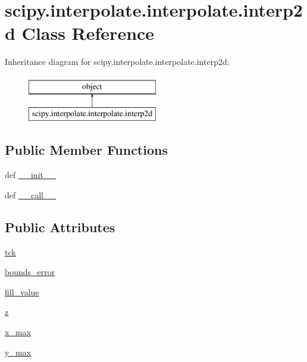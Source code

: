 \hypertarget{classscipy_1_1interpolate_1_1interpolate_1_1interp2d}{}\section{scipy.\+interpolate.\+interpolate.\+interp2d Class Reference}
\label{classscipy_1_1interpolate_1_1interpolate_1_1interp2d}
Inheritance diagram for scipy.\+interpolate.\+interpolate.\+interp2d\+:\begin{figure}[H]
\begin{center}
\leavevmode
\includegraphics[height=2.000000cm]{classscipy_1_1interpolate_1_1interpolate_1_1interp2d}
\end{center}
\end{figure}
\subsection*{Public Member Functions}
\begin{DoxyCompactItemize}
\item 
def \hyperlink{classscipy_1_1interpolate_1_1interpolate_1_1interp2d_a7bb7569e49bfe29d8b22ef46462da961}{\+\_\+\+\_\+init\+\_\+\+\_\+}
\item 
def \hyperlink{classscipy_1_1interpolate_1_1interpolate_1_1interp2d_a33af6dd1c405a6d5972435fbfd6e4d89}{\+\_\+\+\_\+call\+\_\+\+\_\+}
\end{DoxyCompactItemize}
\subsection*{Public Attributes}
\begin{DoxyCompactItemize}
\item 
\hyperlink{classscipy_1_1interpolate_1_1interpolate_1_1interp2d_a1871c088fe10829f973bb1e4c0689550}{tck}
\item 
\hyperlink{classscipy_1_1interpolate_1_1interpolate_1_1interp2d_aa2a04edfb1dabbb23b7c0c2b7f275cb5}{bounds\+\_\+error}
\item 
\hyperlink{classscipy_1_1interpolate_1_1interpolate_1_1interp2d_a388b1cc0c029151e5e30a024e709ebde}{fill\+\_\+value}
\item 
\hyperlink{classscipy_1_1interpolate_1_1interpolate_1_1interp2d_ad58b3135dee512b2cefe24ae986c2ddd}{z}
\item 
\hyperlink{classscipy_1_1interpolate_1_1interpolate_1_1interp2d_aa2576cd550fa9281e31028023d71ffd0}{x\+\_\+max}
\item 
\hyperlink{classscipy_1_1interpolate_1_1interpolate_1_1interp2d_a70c4e24eb28df2e48277e4e2d854c00b}{y\+\_\+max}
\end{DoxyCompactItemize}


